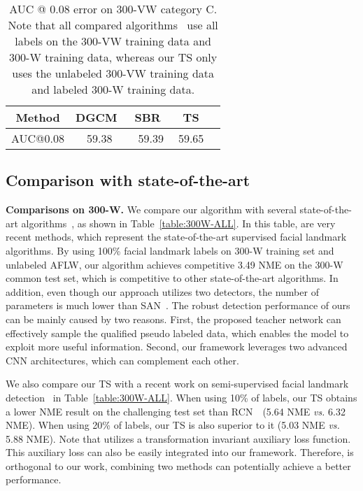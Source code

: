 \documentclass[10pt,twocolumn,letterpaper]{article}
\def\Tabref#1{Table~\ref{#1}}
\def\NAME{{{TS}}} \def\LLB{\textcolor{red}}
\begin{document}
\begin{table}[t]
\setlength{\tabcolsep}{8pt}
\centering
\begin{tabular}{|c|c|c|c|c|} \hline\hline
 Method     & DGCM~\cite{khan2017synergy}& SBR~\cite{dong2018sbr} & {\NAME}  \\\hline
AUC@0.08    &  59.38                     & 59.39 &  59.65 \\
\hline\hline
\end{tabular}
\vspace{2mm}
\caption{
AUC @ 0.08 error on 300-VW category C.
Note that all compared algorithms~\cite{khan2017synergy,dong2018sbr} use all labels on the 300-VW training data and 300-W training data, whereas our {\NAME} only uses the unlabeled 300-VW training data and labeled 300-W training data.
}
\label{table:300VW-C}
\end{table}







\subsection{Comparison with state-of-the-art}\label{sec:compare}



\textbf{Comparisons on 300-W.}
We compare our algorithm with several state-of-the-art algorithms~\cite{xiong2013supervised,xiao2017recurrent,lv2017deep,xiao2017recurrent,jourabloo2017pose,honari2018improving}, as shown in \Tabref{table:300W-ALL}.
In this table, \cite{dong2018san,kumar2018disentangling,dong2018sbr} are very recent methods, which represent the state-of-the-art supervised facial landmark algorithms.
By using 100\% facial landmark labels on 300-W training set and unlabeled AFLW, our algorithm achieves competitive 3.49 NME on the 300-W common test set, which is competitive to other state-of-the-art algorithms.
In addition, even though our approach utilizes two detectors, the number of parameters is much lower than SAN~\cite{dong2018san}.
The robust detection performance of ours can be mainly caused by two reasons.
First, the proposed teacher network can effectively sample the qualified pseudo labeled data, which enables the model to exploit more useful information.
Second, our framework leverages two advanced CNN architectures, which can complement each other.



We also compare our {\NAME} with a recent work on semi-supervised facial landmark detection~\cite{honari2018improving} in \Tabref{table:300W-ALL}.
When using 10\% of labels, our {\NAME} obtains a lower NME result on the challenging test set than RCN~\cite{honari2018improving}~(5.64 NME \emph{vs.} 6.32 NME).
When using 20\% of labels, our {\NAME} is also superior to it (5.03 NME \emph{vs.} 5.88 NME).
Note that \cite{honari2018improving} utilizes a transformation invariant auxiliary loss function.
This auxiliary loss can also be easily integrated into our framework.
Therefore, \cite{honari2018improving} is orthogonal to our work, combining two methods can potentially achieve a better performance.
\end{document}
